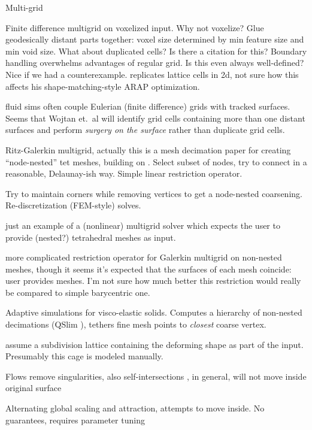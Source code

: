 Multi-grid 


\cite{McAdams:2011} Finite difference multigrid on voxelized input. Why not
voxelize? Glue geodesically distant parts together: voxel size determined by
min feature size and min void size. What about duplicated cells? Is there a
citation for this? Boundary handling overwhelms advantages of regular grid. Is
this even always well-defined? Nice if we had a counterexample.
\cite{Sykora09} replicates lattice cells in 2d, not sure how this affects his
shape-matching-style ARAP optimization.

\cite{wojtan2011liquid} fluid sims often couple Eulerian (finite difference)
grids with tracked surfaces. Seems that Wojtan et.\ al will identify grid cells
containing more than one distant surfaces and perform \emph{surgery on the
surface} rather than duplicate grid cells.

\cite{Adams:1999:PMS} Ritz-Galerkin multigrid, actually this is a mesh
decimation paper for creating ``node-nested'' tet meshes, building on
\cite{guillard1993}. Select subset of nodes, try to connect in a reasonable,
Delaunay-ish way. Simple linear restriction operator.

\cite{Brune:2011} Try to maintain corners while removing vertices to get a
node-nested coarsening.  Re-discretization (FEM-style) solves.

\cite{fish1995efficient} just an example of a (nonlinear) multigrid solver
which expects the user to provide (nested?) tetrahedral meshes as input.

\cite{feng1997non} more complicated restriction operator for Galerkin multigrid
on non-nested meshes, though it seems it's expected that the surfaces of each
mesh coincide: user provides meshes. I'm not sure how much better this
restriction would really be compared to simple barycentric one.

\cite{Debunne:2001:DRD} 
Adaptive simulations for visco-elastic solids. Computes a hierarchy of
non-nested decimations (QSlim \cite{Garland:1997:SSU}), tethers fine mesh
points to \emph{closest} coarse vertex.

\cite{CGCDP:2002} assume a subdivision lattice containing the deforming shape
as part of the input. Presumably this cage is modeled manually.

Flows
\cite{Kazhdan2012} remove singularities, also self-intersections
\cite{Sacht:SIV:2013}, in general, will not move inside original surface

Alternating global scaling and attraction, attempts to move inside. No
guarantees, requires parameter tuning \cite{Wang:2008}

